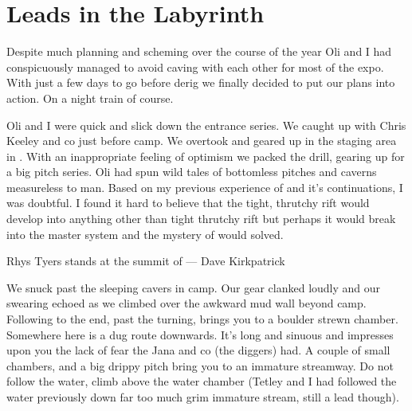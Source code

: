 \begin{marginfigure}
\end{marginfigure}

\section{Leads in the Labyrinth}
 
Despite much planning and scheming over the course of the year Oli and I had conspicuously managed to avoid caving with each other for most of the expo. With just a few days to go before derig we finally decided to put our plans into action. On a night train of course.
 
Oli and I were quick and slick down the entrance series. We caught up with Chris Keeley and co just before camp. We overtook and geared up in the staging area in . With an inappropriate feeling of optimism we packed the drill, gearing up for a big pitch series. Oli had spun wild tales of bottomless pitches and caverns measureless to man. Based on my previous experience of  and it’s continuations, I was doubtful. I found it hard to believe that the tight, thrutchy rift would develop into anything other than tight thrutchy rift but perhaps it would break into the master system and the mystery of  would solved. 


 \begin{marginfigure}
\centering
{}
\label{Rhys Skrbina}
\caption{Rhys Tyers stands at the summit of \protect{} --- Dave Kirkpatrick}
\end{marginfigure}

 
We snuck past the sleeping cavers in camp. Our gear clanked loudly and our swearing echoed as we climbed over the awkward mud wall beyond camp. Following  to the end, past the  turning, brings you to a boulder strewn chamber. Somewhere here is a dug route downwards. It’s long and sinuous and impresses upon you the lack of fear the Jana and co (the diggers) had. A couple of small chambers, and a big drippy pitch bring you to an immature streamway. Do not follow the water, climb above the water chamber (Tetley and I had followed the water previously down far too much grim immature stream, still a lead though). 
 
